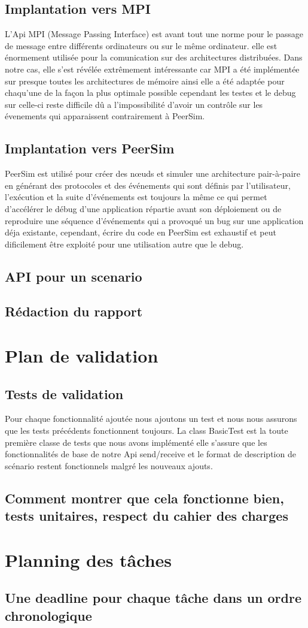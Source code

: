 \documentclass{article}
\begin{document}
			\subsection{Implantation vers MPI}
			L'Api MPI (Message Passing Interface) est avant tout une norme pour le passage de message entre différents ordinateurs ou sur le même ordinateur.
			elle est énormement utilisée pour la comunication sur des architectures distribuées.
			Dans notre cas, elle s'est révélée extrêmement intéressante car MPI a été implémentée sur presque toutes les architectures de mémoire ainsi elle 
			a été adaptée pour chaqu'une de la façon la plus optimale possible cependant les testes et le debug sur celle-ci reste difficile dû a l'impossibilité 
			d'avoir un contrôle sur les évenements qui apparaissent contrairement à PeerSim.
			\subsection{Implantation vers PeerSim}
			PeerSim est utilisé pour créer des nœuds et simuler une architecture pair-à-paire en générant des protocoles et des événements 
			qui sont définis par l'utilisateur, l'exécution et la suite d'événements est toujours la même ce qui permet d'accélérer 
			le débug d'une application répartie avant son déploiement ou de reproduire une séquence d'événements qui a provoqué un bug
			sur une application déja existante, cependant, écrire du code en PeerSim est exhaustif et peut dificilement être exploité pour une utilisation
			autre que le debug.
			\subsection{API pour un scenario}
			\subsection{Rédaction du rapport}

		\section{Plan de validation}
		\subsection{Tests de validation}
		Pour chaque fonctionnalité ajoutée nous ajoutons un test et nous nous assurons que les tests précédents fonctionnent toujours.
		\newline
		La class BasicTest est la toute première classe de tests que nous avons implémenté elle s'assure que les fonctionnalités de base de notre Api
		send/receive et le format de description de scénario restent fonctionnels malgré les nouveaux ajouts.
			\subsection{Comment montrer que cela fonctionne bien, tests unitaires, respect du cahier des charges}
		\section{Planning des tâches}
			\subsection{Une deadline pour chaque tâche dans un ordre chronologique}
\end{document}
